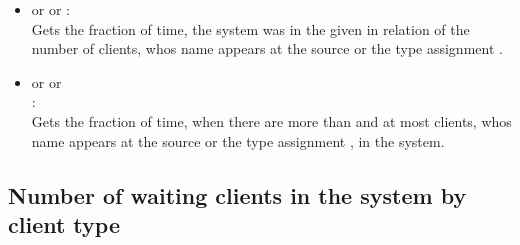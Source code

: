 \begin{itemize}
\item
{} or  or :\\
Gets the fraction of time, the system was in the given  in relation of the number of clients, whos name appears at the source or the type assignment .

\item
{} or  or\\
:\\
Gets the fraction of time, when there are more than  and at most  clients, whos name appears at the source or the type assignment , in the system.

\end{itemize}



\subsection{Number of waiting clients in the system by client type}

